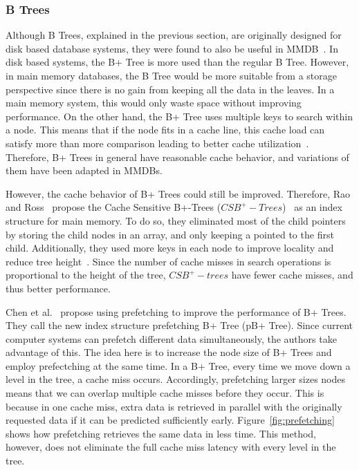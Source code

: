 \documentclass[12pt,a4paper]{article}
\begin{document}

\subsubsection*{B Trees}
Although B Trees, explained in the previous section, are originally designed for disk based database systems, they were found to also be useful in
MMDB~\cite{lehman1986study}. In disk based systems, the B+ Tree is more used than the regular B Tree. However, in main memory databases, the B Tree would be
more suitable from a storage perspective since there is no gain from keeping all the data in the leaves. In a main memory system, this
would only waste space without improving performance. On the other hand, the B+ Tree uses multiple keys to search within a node. This means that
if the node fits in a cache line, this cache load can satisfy more than more comparison leading to better cache utilization~\cite{rao1999cache}. Therefore, B+
Trees in general have reasonable cache behavior, and variations of them have been adapted in MMDBs.

However, the cache behavior of B+ Trees could still be improved. Therefore, Rao and Ross~\cite{rao2000making} propose the Cache Sensitive B+-Trees
($CSB^{+}-Trees$)~\cite{rao2000making} as an index structure for main memory. To do so, they eliminated most of the child pointers by storing the child nodes
in an array, and only keeping a pointed to the first child. Additionally, they used more keys in each
node to improve locality and reduce tree height~\cite{luan2009prefetching}. Since the number of cache misses in search operations is proportional to the height
of the tree, $CSB^{+}-trees$ have fewer cache misses, and thus better performance.

Chen et al.~\cite{chen2001improving} propose using prefetching to improve the performance of B+ Trees. They call the new index structure prefetching B+ Tree
(pB+ Tree). Since current computer systems can prefetch different data simultaneously, the authors take advantage of this. The idea here is to increase the node
size of B+ Trees and employ prefectching at the same time. In a B+ Tree, every time we move down a level in the tree, a cache miss occurs. Accordingly,
prefetching larger sizes nodes means that we can overlap multiple cache misses before they occur. This is because in one cache miss, extra data is retrieved in
parallel with the originally requested data if it can be predicted sufficiently early. Figure~\ref{fig:prefetching} shows how prefetching retrieves the same
data in less time. This method, however, does not eliminate the full cache miss latency with every level in the tree.
\end{document}
